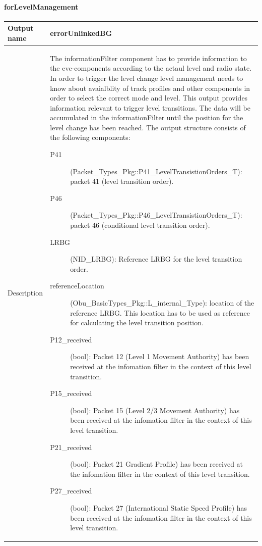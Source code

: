 \paragraph{forLevelManagement}

\begin{longtable}{p{}p{}}
\toprule
Output name				& errorUnlinkedBG \\
\midrule
Description				& The informationFilter component has to provide information to the evc-components according to the actaul level and radio state. In order to trigger the level change level management needs to know about avaialblity of track profiles and other components in order to select the correct mode and level. This output provides information relevant to trigger level transitions. The data will be accumulated in the informationFilter until the position for the level change has been reached. The output structure consists of the following components:
\begin{description}
\item[P41](Packet\_Types\_Pkg::P41\_LevelTransistionOrders\_T): packet 41 (level transition order). 
\item[P46](Packet\_Types\_Pkg::P46\_LevelTransistionOrders\_T): packet 46 (conditional level transition order). 
\item[LRBG](NID\_LRBG): Reference LRBG for the level transition order.
\item[referenceLocation](Obu\_BasicTypes\_Pkg::L\_internal\_Type): location of the reference LRBG. This location has to be used as reference for calculating the level transition position. 
\item[P12\_received](bool): Packet 12 (Level 1 Movement Authority) has been received at the infomation filter in the context of this level transition. 
\item[P15\_received](bool): Packet 15 (Level 2/3 Movement Authority) has been received at the infomation filter in the context of this level transition. 
\item[P21\_received](bool): Packet 21 Gradient Profile) has been received at the infomation filter in the context of this level transition. 
\item[P27\_received](bool): Packet 27 (International Static Speed Profile) has been received at the infomation filter in the context of this level transition. 
\end{description}


\end{longtable}

